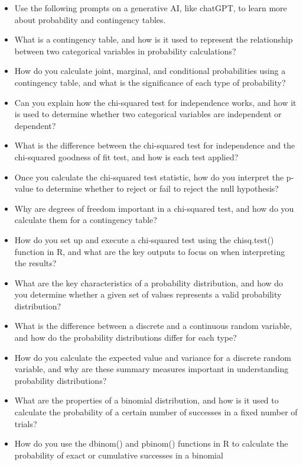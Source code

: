 \documentclass[
  letterpaper,
  DIV=11,
  numbers=noendperiod]{scrreprt}
\begin{document}
\begin{itemize}
\item
  Use the following prompts on a generative AI, like chatGPT, to learn
  more about probability and contingency tables.
\item
  What is a contingency table, and how is it used to represent the
  relationship between two categorical variables in probability
  calculations?
\item
  How do you calculate joint, marginal, and conditional probabilities
  using a contingency table, and what is the significance of each type
  of probability?
\item
  Can you explain how the chi-squared test for independence works, and
  how it is used to determine whether two categorical variables are
  independent or dependent?
\item
  What is the difference between the chi-squared test for independence
  and the chi-squared goodness of fit test, and how is each test
  applied?
\item
  Once you calculate the chi-squared test statistic, how do you
  interpret the p-value to determine whether to reject or fail to reject
  the null hypothesis?
\item
  Why are degrees of freedom important in a chi-squared test, and how do
  you calculate them for a contingency table?
\item
  How do you set up and execute a chi-squared test using the
  chisq.test() function in R, and what are the key outputs to focus on
  when interpreting the results?
\item
  What are the key characteristics of a probability distribution, and
  how do you determine whether a given set of values represents a valid
  probability distribution?
\item
  What is the difference between a discrete and a continuous random
  variable, and how do the probability distributions differ for each
  type?
\item
  How do you calculate the expected value and variance for a discrete
  random variable, and why are these summary measures important in
  understanding probability distributions?
\item
  What are the properties of a binomial distribution, and how is it used
  to calculate the probability of a certain number of successes in a
  fixed number of trials?
\item
  How do you use the dbinom() and pbinom() functions in R to calculate
  the probability of exact or cumulative successes in a binomial

\end{itemize}
\end{document}
